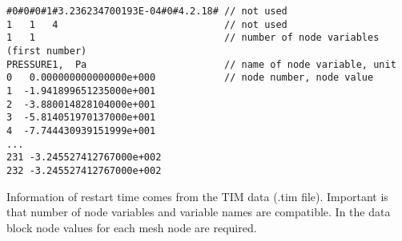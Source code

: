 {\begin{verbatim}
#0#0#0#1#3.236234700193E-04#0#4.2.18# // not used
1   1   4                             // not used
1   1                                 // number of node variables (first number)
PRESSURE1,  Pa                        // name of node variable, unit
0   0.000000000000000e+000            // node number, node value
1  -1.941899651235000e+001
2  -3.880014828104000e+001
3  -5.814051970137000e+001
4  -7.744430939151999e+001
...
231 -3.245527412767000e+002
232 -3.245527412767000e+002
\end{verbatim}

Information of restart time comes from the TIM data (.tim file).
Important is that number of node variables and variable names are
compatible. In the data block node values for each mesh node are
required.

}
